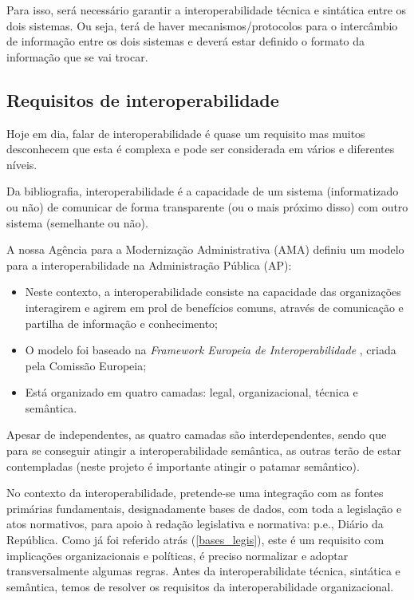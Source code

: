 Para isso, será necessário garantir a interoperabilidade técnica e sintática entre os dois sistemas. 
Ou seja, terá de haver mecanismos/protocolos para o intercâmbio de informação entre os dois sistemas e 
deverá estar definido o formato da informação que se vai trocar.


\subsection{Requisitos de interoperabilidade}

Hoje em dia, falar de interoperabilidade é quase um requisito mas muitos desconhecem que esta é complexa 
e pode ser considerada em vários e diferentes níveis.

Da bibliografia, interoperabilidade é a capacidade de um sistema (informatizado ou não) de comunicar de 
forma transparente (ou o mais próximo disso) com outro sistema (semelhante ou não).

A nossa Agência para a Modernização Administrativa (AMA)  definiu um modelo para a interoperabilidade na 
Administração Pública (AP):
\begin{itemize}
\item Neste contexto, a interoperabilidade consiste na capacidade das organizações interagirem 
e agirem em prol de benefícios comuns, através de comunicação e partilha de informação e conhecimento;
\item O modelo foi baseado na \emph{Framework Europeia de Interoperabilidade} \cite{EIF}, criada pela Comissão Europeia;
\item Está organizado em quatro camadas: legal, organizacional, técnica e semântica.
\end{itemize}

Apesar de independentes, as quatro camadas são interdependentes, sendo que para se conseguir atingir a interoperabilidade 
semântica, as outras terão de estar contempladas (neste projeto é importante atingir o patamar semântico).

No contexto da interoperabilidade, pretende-se uma integração com as fontes primárias fundamentais, 
designadamente bases de dados, com toda a
legislação e atos normativos, para apoio à redação legislativa e normativa: p.e., Diário da
República. Como já foi referido atrás (\ref{bases_legis}), este é um requisito com implicações
organizacionais e políticas, é preciso normalizar e adoptar transversalmente algumas regras. Antes da 
interoperabilidate técnica, sintática e semântica, temos de resolver os requisitos da 
interoperabilidade organizacional.

